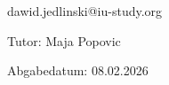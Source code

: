 \vspace*{-6mm}

\begin{large} 
\begin{center}
dawid.jedlinski@iu-study.org
\end{center}
\end{large} 

\vspace*{-6mm}



\vspace*{10mm}

\begin{large} 
\begin{center}
Tutor: Maja Popovic
\end{center}
\end{large} 



\vspace*{-6mm}

\begin{large} 
\begin{center}
Abgabedatum: 08.02.2026
\end{center}
\end{large} 


\pagestyle{empty} %

